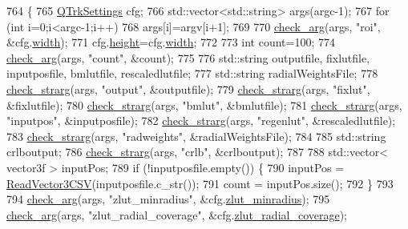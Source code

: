 \begin{DoxyCode}
764 \{
765     \hyperlink{struct_q_trk_settings}{QTrkSettings} cfg;
766     std::vector<std::string> args(argc-1);
767     \textcolor{keywordflow}{for} (\textcolor{keywordtype}{int} i=0;i<argc-1;i++)
768         args[i]=argv[i+1];
769     
770     \hyperlink{test_8cu_adb9b960bf793e814eeeb65f6a67e0ab9}{check\_arg}(args, \textcolor{stringliteral}{"roi"}, &cfg.\hyperlink{struct_q_trk_settings_aef24eb3a4692bd67ff1aca8ef950e08d}{width});
771     cfg.\hyperlink{struct_q_trk_settings_a94c965d103e7a0a4f1fced8eee1324ce}{height}=cfg.\hyperlink{struct_q_trk_settings_aef24eb3a4692bd67ff1aca8ef950e08d}{width};
772 
773     \textcolor{keywordtype}{int} count=100;
774     \hyperlink{test_8cu_adb9b960bf793e814eeeb65f6a67e0ab9}{check\_arg}(args, \textcolor{stringliteral}{"count"}, &count);
775 
776     std::string outputfile, fixlutfile, inputposfile, bmlutfile, rescaledlutfile;
777     std::string radialWeightsFile;
778     \hyperlink{test_8cu_a24cd40cfdf669f745fb58fda2a99469c}{check\_strarg}(args, \textcolor{stringliteral}{"output"}, &outputfile);
779     \hyperlink{test_8cu_a24cd40cfdf669f745fb58fda2a99469c}{check\_strarg}(args, \textcolor{stringliteral}{"fixlut"}, &fixlutfile);
780     \hyperlink{test_8cu_a24cd40cfdf669f745fb58fda2a99469c}{check\_strarg}(args, \textcolor{stringliteral}{"bmlut"}, &bmlutfile);
781     \hyperlink{test_8cu_a24cd40cfdf669f745fb58fda2a99469c}{check\_strarg}(args, \textcolor{stringliteral}{"inputpos"}, &inputposfile);
782     \hyperlink{test_8cu_a24cd40cfdf669f745fb58fda2a99469c}{check\_strarg}(args, \textcolor{stringliteral}{"regenlut"}, &rescaledlutfile);
783     \hyperlink{test_8cu_a24cd40cfdf669f745fb58fda2a99469c}{check\_strarg}(args, \textcolor{stringliteral}{"radweights"}, &radialWeightsFile);
784 
785     std::string crlboutput;
786     \hyperlink{test_8cu_a24cd40cfdf669f745fb58fda2a99469c}{check\_strarg}(args, \textcolor{stringliteral}{"crlb"}, &crlboutput);
787 
788     std::vector< vector3f > inputPos;
789     \textcolor{keywordflow}{if} (!inputposfile.empty()) \{
790         inputPos = \hyperlink{utils_8cpp_abc30341e16799156a1b3b6093ea7d3d5}{ReadVector3CSV}(inputposfile.c\_str());
791         count = inputPos.size();
792     \}
793 
794     \hyperlink{test_8cu_adb9b960bf793e814eeeb65f6a67e0ab9}{check\_arg}(args, \textcolor{stringliteral}{"zlut\_minradius"}, &cfg.\hyperlink{struct_q_trk_settings_a1a14537a9e784c65eed512e72ee86c02}{zlut\_minradius});
795     \hyperlink{test_8cu_adb9b960bf793e814eeeb65f6a67e0ab9}{check\_arg}(args, \textcolor{stringliteral}{"zlut\_radial\_coverage"}, &cfg.\hyperlink{struct_q_trk_settings_ae57544152a8a129bae6cb934feead1c7}{zlut\_radial\_coverage});

\end{DoxyCode}
